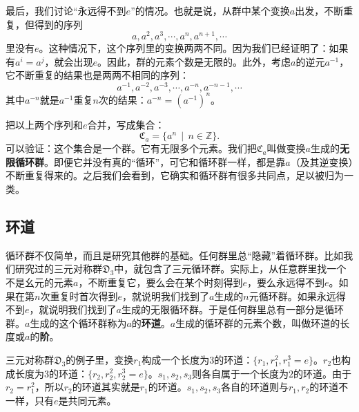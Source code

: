 \documentclass[12pt,UTF8,fontset=none]{ctexbook}
\begin{document}
最后，我们讨论“永远得不到$e$”的情况。也就是说，从群中某个变换$a$出发，不断重复，但得到的序列
$$ a, a^2, a^3, \cdots, a^n, a^{n+1}, \cdots $$
里没有$e$。这种情况下，这个序列里的变换两两不同。因为我们已经证明了：如果有$a^i = a^j$，就会出现$e$。因此，群的元素个数是无限的。此外，考虑$a$的逆元$a^{-1}$，它不断重复的结果也是两两不相同的序列：
$$ a^{-1}, a^{-2}, a^{-3}, \cdots, a^{-n}, a^{-n-1}, \cdots$$
其中$a^{-n}$就是$a^{-1}$重复$n$次的结果：$a^{-n} = \left(a^{-1}\right)^n$。

把以上两个序列和$e$合并，写成集合：
$$ \mathfrak{C}_a = \{a^n\,\mid\,n\in\mathbb{Z}\}.$$
可以验证：这个集合是一个群。它有无限多个元素。我们把$\mathfrak{C}_a$叫做变换$a$生成的\textbf{无限循环群}。即便它并没有真的“循环”，可它和循环群一样，都是靠$a$（及其逆变换）不断重复得来的。之后我们会看到，它确实和循环群有很多共同点，足以被归为一类。

\subsection{环道}

循环群不仅简单，而且是研究其他群的基础。任何群里总“隐藏”着循环群。比如我们研究过的三元对称群$\mathfrak{D}_3$中，就包含了三元循环群。实际上，从任意群里找一个不是幺元的元素$a$，不断重复它，要么会在某个时刻得到$e$，要么永远得不到$e$。如果在第$n$次重复时首次得到$e$，就说明我们找到了$a$生成的$n$元循环群。如果永远得不到$e$，就说明我们找到了$a$生成的无限循环群。于是任何群里总有一部分是循环群。$a$生成的这个循环群称为$a$的\textbf{环道}。$a$生成的循环群的元素个数，叫做环道的长度或$a$的\textbf{阶}。

三元对称群$\mathfrak{D}_3$的例子里，变换$r_1$构成一个长度为$3$的环道：$\{r_1, r_1^2, r_1^3 = e\}$。$r_2$也构成长度为$3$的环道：$\{r_2, r_2^2, r_2^3 = e\}$。$s_1,s_2,s_3$则各自属于一个长度为$2$的环道。由于$r_2 = r_1^2$，所以$r_2$的环道其实就是$r_1$的环道。$s_1,s_2,s_3$各自的环道则与$r_1,r_2$的环道不一样，只有$e$是共同元素。
\end{document}
